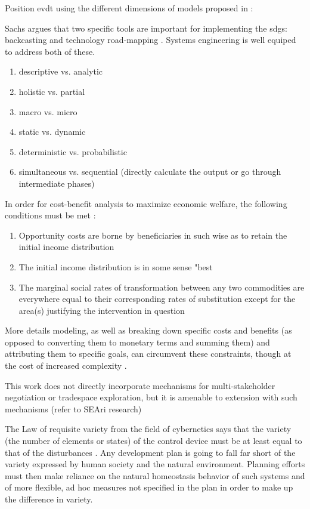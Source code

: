 Position \ac{evdt} using the different dimensions of models proposed in \cite{harrisQuantitativeModelsUrban1972}:


Sachs argues that two specific tools are important for implementing the \acp{sdg}: backcasting and technology road-mapping \cite{sachsAgeSustainableDevelopment2015}. Systems engineering is well equiped to address both of these.

\begin{enumerate}[itemsep=0pt,parsep=0pt]
	\item{descriptive vs. analytic}
	\item{holistic vs. partial}
	\item{macro vs. micro}
	\item{static vs. dynamic}
	\item{deterministic vs. probabilistic}
	\item{simultaneous vs. sequential (directly calculate the output or go through intermediate phases)}
\end{enumerate}


In order for cost-benefit analysis to maximize economic welfare, the following conditions must be met \cite{krutillaWelfareAspectsBenefitCost1961}:

\begin{enumerate}[itemsep=0pt,parsep=0pt]
	\item{Opportunity costs are borne by beneficiaries in  such wise as to retain the initial income distribution}
	\item{The initial income distribution is in some sense "best}
	\item{The marginal social rates of transformation between any two commodities are everywhere equal to their corresponding rates of substitution except for the area(s) justifying the intervention in question}
\end{enumerate}

More details modeling, as well as breaking down specific costs and benefits (as opposed to converting them to monetary terms and summing them) and attributing them to specific goals, can circumvent these constraints, though at the cost of increased complexity \cite{hillGoalsAchievementMatrixEvaluating1972}.

This work does not directly incorporate mechanisms for multi-stakeholder negotiation or tradespace exploration, but it is amenable to extension with such mechanisms (refer to SEAri research)

The Law of requisite variety from the field of cybernetics says that the variety (the number of elements or states) of the control device must be at least equal to that of the disturbances \cite{ashbyRequisiteVarietyIts1991}. Any development plan is going to fall far short of the variety expressed by human society and the natural environment. Planning efforts must then make reliance on the natural homeostasis behavior of such systems and of more flexible, ad hoc measures not specified in the plan in order to make up the difference in variety. \cite{mcloughlinSystemGuidanceControl1972}

